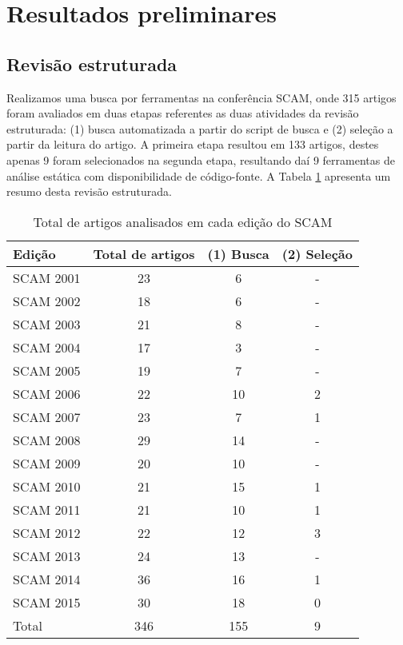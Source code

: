  \label{conclusoes}

\section{Resultados preliminares}

\subsection{Revisão estruturada}

Realizamos uma busca por ferramentas na conferência SCAM, onde 315 artigos
foram avaliados em duas etapas referentes as duas atividades da revisão
estruturada: (1) busca automatizada a partir do script de busca e (2) seleção
a partir da leitura do artigo. A primeira etapa resultou em 133 artigos,
destes apenas 9 foram selecionados na segunda etapa, resultando daí 9
ferramentas de análise estática com disponibilidade de código-fonte.
A Tabela \ref{artigos-do-scam} apresenta um resumo desta revisão estruturada.

\begin{table}[H]
\caption{Total de artigos analisados em cada edição do SCAM}
\centering
\begin{tabular}{| l | c | c | c |}
\hline
Edição    & Total de artigos & (1) Busca & (2) Seleção \\
\hline
SCAM 2001 & 23    & 6         & -           \\
SCAM 2002 & 18    & 6         & -           \\
SCAM 2003 & 21    & 8         & -           \\
SCAM 2004 & 17    & 3         & -           \\
SCAM 2005 & 19    & 7         & -           \\
SCAM 2006 & 22    & 10        & 2           \\
SCAM 2007 & 23    & 7         & 1           \\
SCAM 2008 & 29    & 14        & -           \\
SCAM 2009 & 20    & 10        & -           \\
SCAM 2010 & 21    & 15        & 1           \\
SCAM 2011 & 21    & 10        & 1           \\
SCAM 2012 & 22    & 12        & 3           \\
SCAM 2013 & 24    & 13        & -           \\
SCAM 2014 & 36    & 16        & 1           \\
SCAM 2015 & 30    & 18        & 0           \\
\hline
Total     & 346   & 155       & 9           \\
\hline
\end{tabular}
\label{artigos-do-scam}
\end{table}

